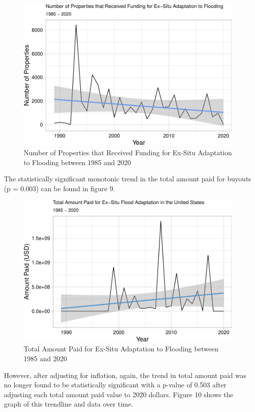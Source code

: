 \documentclass[
  12pt,
]{article}
\begin{document}
\begin{figure}
\centering
\includegraphics{finalreport_files/figure-latex/unnamed-chunk-14-1.pdf}
\caption{Number of Properties that Received Funding for Ex-Situ
Adaptation to Flooding between 1985 and 2020}
\end{figure}

The statistically significant monotonic trend in the total amount paid
for buyouts (p = 0.003) can be found in figure 9.

\begin{figure}
\centering
\includegraphics{finalreport_files/figure-latex/unnamed-chunk-15-1.pdf}
\caption{Total Amount Paid for Ex-Situ Adaptation to Flooding between
1985 and 2020}
\end{figure}

However, after adjusting for inflation, again, the trend in total amount
paid was no longer found to be statistically significant with a p-value
of 0.503 after adjusting each total amount paid value to 2020 dollars.
Figure 10 shows the graph of this trendline and data over time.
\end{document}
